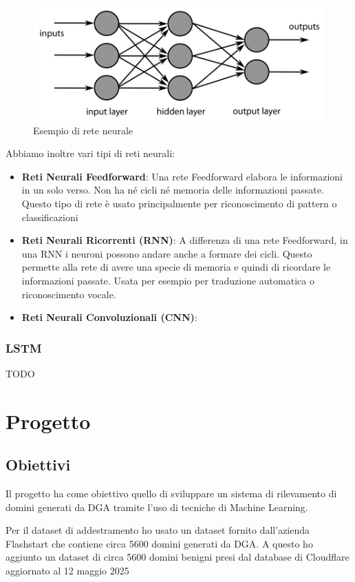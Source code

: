 \documentclass[12pt,a4paper,openright,twoside]{book}
\begin{document}
\begin{figure}
    \centering
    \includegraphics[width=.8\linewidth]{figures/MultiLayerNeuralNetwork.png}
    \caption{Esempio di rete neurale \cite{wiki:001}}
    \label{fig:ANN}
\end{figure}

Abbiamo inoltre vari tipi di reti neurali:
\begin{itemize}
    \item \textbf{Reti Neurali Feedforward}: Una rete Feedforward
    elabora le informazioni in un solo verso. Non ha né cicli
    né memoria delle informazioni passate. Questo tipo di rete
    è usato principalmente per riconoscimento di pattern o classificazioni
    \item \textbf{Reti Neurali Ricorrenti (RNN)}:
    A differenza di una rete Feedforward, in una RNN 
    i neuroni possono andare anche a formare dei cicli. 
    Questo permette alla rete di avere una specie di memoria
    e quindi di ricordare le informazioni passate. Usata
    per esempio per traduzione automatica o riconoscimento vocale.
    \item \textbf{Reti Neurali Convoluzionali (CNN)}:
\end{itemize}


\subsection{LSTM}

TODO

\chapter{Progetto}
\section{Obiettivi}
Il progetto ha come obiettivo quello di sviluppare un sistema
di rilevamento di domini generati da \acrshort{DGA} tramite
l'uso di tecniche di Machine Learning. 

Per il dataset di addestramento ho usato un dataset fornito dall'azienda 
Flashstart che contiene circa 5600 domini generati da \acrshort{DGA}.
A questo ho aggiunto un dataset di circa 5600 domini benigni
presi dal database di Cloudflare aggiornato
al 12 maggio 2025\cite{cloudflare_domains}
\end{document}
